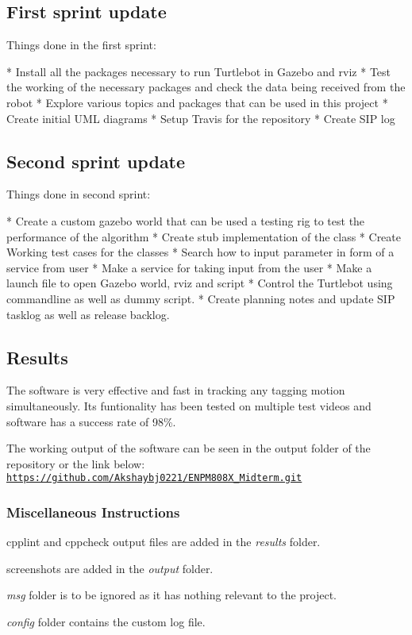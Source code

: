 \subsection*{First sprint update}

Things done in the first sprint\+: \begin{DoxyVerb}* Install all the packages necessary to run Turtlebot in Gazebo and rviz
* Test the working of the necessary packages and check the data being received from the robot
* Explore various topics and packages that can be used in this project
* Create initial UML diagrams
* Setup Travis for the repository
* Create SIP log
\end{DoxyVerb}


\subsection*{Second sprint update}

Things done in second sprint\+: \begin{DoxyVerb}* Create a custom gazebo world that can be used a testing rig to test the performance of the algorithm 
* Create stub implementation of the class 
* Create Working test cases for the classes 
* Search how to input parameter in form of a service from user 
* Make a service for taking input from the user 
* Make a launch file to open Gazebo world, rviz and script  
* Control the Turtlebot using commandline as well as dummy script.
* Create planning notes and update SIP tasklog as well as release backlog. 
\end{DoxyVerb}


\subsection*{Results}

The software is very effective and fast in tracking any tagging motion simultaneously. Its funtionality has been tested on multiple test videos and software has a success rate of 98\%.

The working output of the software can be seen in the output folder of the repository or the link below\+: \href{https://github.com/Akshaybj0221/ENPM808X_Midterm.git}{\tt https\+://github.\+com/\+Akshaybj0221/\+E\+N\+P\+M808\+X\+\_\+\+Midterm.\+git}

\subsubsection*{Miscellaneous Instructions}


\begin{DoxyEnumerate}
\item cpplint and cppcheck output files are added in the {\itshape results} folder.
\item screenshots are added in the {\itshape output} folder.
\item {\itshape msg} folder is to be ignored as it has nothing relevant to the project.
\item {\itshape config} folder contains the custom log file. 
\end{DoxyEnumerate}